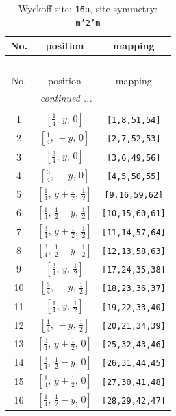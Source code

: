 \documentclass[fleqn,8pt]{jsarticle}
\begin{document}
\renewcommand{\arraystretch}{1.2}
\begin{longtable}{ccc}
\caption{Wyckoff site: {\tt 16o}, site symmetry: {\tt m'2'm}}
 \\
 \hline \hline
No. & position & mapping \\ \hline \endfirsthead

\multicolumn{2}{l}{\tablename\ \thetable{}} \\
 \hline \hline
No. & position & mapping \\ \hline \endhead

 \hline \hline
\multicolumn{2}{r}{\footnotesize\it continued ...} \\ \endfoot

 \hline \hline
\multicolumn{2}{r}{} \\ \endlastfoot

1 & $\left[ \frac{1}{4},\, y,\, 0 \right]$ & {\tt [1,8,51,54]} \\ \hline
2 & $\left[ \frac{1}{4},\, - y,\, 0 \right]$ & {\tt [2,7,52,53]} \\ \hline
3 & $\left[ \frac{3}{4},\, y,\, 0 \right]$ & {\tt [3,6,49,56]} \\ \hline
4 & $\left[ \frac{3}{4},\, - y,\, 0 \right]$ & {\tt [4,5,50,55]} \\ \hline
5 & $\left[ \frac{1}{4},\, y + \frac{1}{2},\, \frac{1}{2} \right]$ & {\tt [9,16,59,62]} \\ \hline
6 & $\left[ \frac{1}{4},\, \frac{1}{2} - y,\, \frac{1}{2} \right]$ & {\tt [10,15,60,61]} \\ \hline
7 & $\left[ \frac{3}{4},\, y + \frac{1}{2},\, \frac{1}{2} \right]$ & {\tt [11,14,57,64]} \\ \hline
8 & $\left[ \frac{3}{4},\, \frac{1}{2} - y,\, \frac{1}{2} \right]$ & {\tt [12,13,58,63]} \\ \hline
9 & $\left[ \frac{3}{4},\, y,\, \frac{1}{2} \right]$ & {\tt [17,24,35,38]} \\ \hline
10 & $\left[ \frac{3}{4},\, - y,\, \frac{1}{2} \right]$ & {\tt [18,23,36,37]} \\ \hline
11 & $\left[ \frac{1}{4},\, y,\, \frac{1}{2} \right]$ & {\tt [19,22,33,40]} \\ \hline
12 & $\left[ \frac{1}{4},\, - y,\, \frac{1}{2} \right]$ & {\tt [20,21,34,39]} \\ \hline
13 & $\left[ \frac{3}{4},\, y + \frac{1}{2},\, 0 \right]$ & {\tt [25,32,43,46]} \\ \hline
14 & $\left[ \frac{3}{4},\, \frac{1}{2} - y,\, 0 \right]$ & {\tt [26,31,44,45]} \\ \hline
15 & $\left[ \frac{1}{4},\, y + \frac{1}{2},\, 0 \right]$ & {\tt [27,30,41,48]} \\ \hline
16 & $\left[ \frac{1}{4},\, \frac{1}{2} - y,\, 0 \right]$ & {\tt [28,29,42,47]} \\
\end{longtable}
\end{document}
